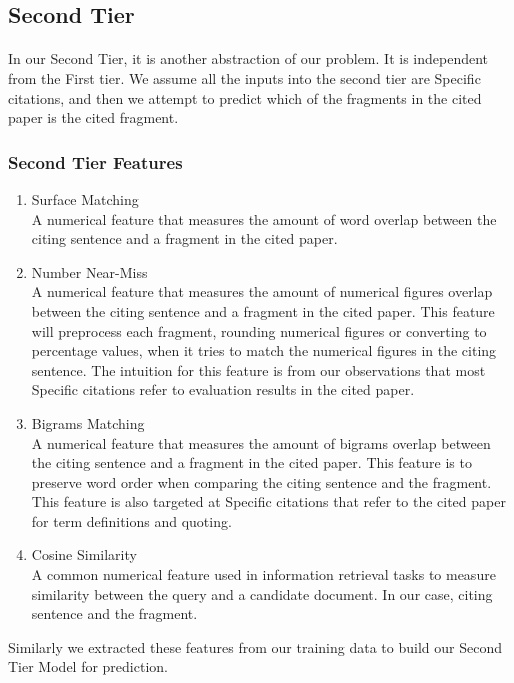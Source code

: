 \subsection{Second Tier}
\paragraph{}
In our Second Tier, it is another abstraction of our problem. It is independent from the First tier. We assume all the inputs into the second tier are Specific citations, and then we attempt to predict which of the fragments in the cited paper is the cited fragment.

\subsubsection{Second Tier Features}
\begin{enumerate}
\item Surface Matching \\
A numerical feature that measures the amount of word overlap between the citing sentence and a fragment in the cited paper.

\item Number Near-Miss \\
A numerical feature that measures the amount of numerical figures overlap between the citing sentence and a fragment in the cited paper. This feature will preprocess each fragment, rounding numerical figures or converting to percentage values, when it tries to match the numerical figures in the citing sentence. The intuition for this feature is from our observations that most Specific citations refer to evaluation results in the cited paper.

\item Bigrams Matching \\
A numerical feature that measures the amount of bigrams overlap between the citing sentence and a fragment in the cited paper. This feature is to preserve word order when comparing the citing sentence and the fragment. This feature is also targeted at Specific citations that refer to the cited paper for term definitions and quoting.

\item Cosine Similarity \\
A common numerical feature used in information retrieval tasks to measure similarity between the query and a candidate document. In our case, citing sentence and the fragment.
\end{enumerate}
Similarly we extracted these features from our training data to build our Second Tier Model for prediction.